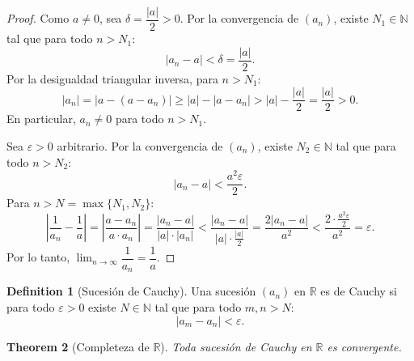 \documentclass[11pt,a4paper]{article}
\theoremstyle{plain}
\newtheorem{theorem}{Theorem}[section]
\theoremstyle{definition}
\newtheorem{definition}[theorem]{Definition}
\begin{document}
\begin{proof}
Como $a \neq 0$, sea $\delta = \dfrac{|a|}{2} > 0$. Por la convergencia de $(a_n)$, existe $N_1 \in \mathbb{N}$ tal que para todo $n > N_1$:
\[
|a_n - a| < \delta = \frac{|a|}{2}.
\]
Por la desigualdad triangular inversa, para $n > N_1$:
\[
|a_n| = |a - (a - a_n)| \geq |a| - |a - a_n| > |a| - \frac{|a|}{2} = \frac{|a|}{2} > 0.
\]
En particular, $a_n \neq 0$ para todo $n > N_1$.

Sea $\varepsilon > 0$ arbitrario. Por la convergencia de $(a_n)$, existe $N_2 \in \mathbb{N}$ tal que para todo $n > N_2$:
\[
|a_n - a| < \frac{a^2 \varepsilon}{2}.
\]
Para $n > N = \max\{N_1, N_2\}$:
\[
\left|\frac{1}{a_n} - \frac{1}{a}\right| = \left|\frac{a - a_n}{a \cdot a_n}\right| = \frac{|a_n - a|}{|a| \cdot |a_n|} < \frac{|a_n - a|}{|a| \cdot \frac{|a|}{2}} = \frac{2|a_n - a|}{a^2} < \frac{2 \cdot \frac{a^2 \varepsilon}{2}}{a^2} = \varepsilon.
\]
Por lo tanto, $\lim_{n\to\infty} \dfrac{1}{a_n} = \dfrac{1}{a}$.
\end{proof}


\begin{definition}[Sucesión de Cauchy]
Una sucesión $(a_n)$ en $\mathbb{R}$ es de Cauchy si para todo $\varepsilon > 0$ existe $N \in \mathbb{N}$ tal que para todo $m, n > N$:
\[
|a_m - a_n| < \varepsilon.
\]
\end{definition}

\begin{theorem}[Completeza de $\mathbb{R}$]
Toda sucesión de Cauchy en $\mathbb{R}$ es convergente.
\end{theorem}
\end{document}
